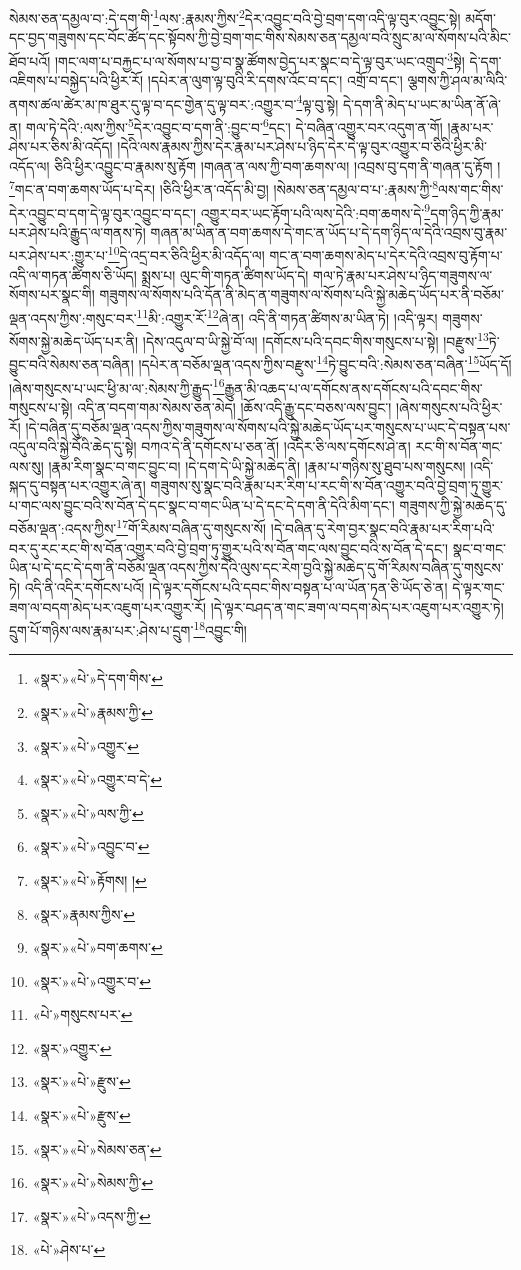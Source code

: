 སེམས་ཅན་དམྱལ་བ་:དེ་དག་གི་\footnote{«སྣར་»«པེ་»དེ་དག་གིས་}ལས་:རྣམས་ཀྱིས་\footnote{«སྣར་»«པེ་»རྣམས་ཀྱི་}དེར་འབྱུང་བའི་བྱེ་བྲག་དག་འདི་ལྟ་བུར་འབྱུང་སྟེ། མདོག་དང་བྱད་གཟུགས་དང་བོང་ཚོད་དང་སྟོབས་ཀྱི་བྱེ་བྲག་གང་གིས་སེམས་ཅན་དམྱལ་བའི་སྲུང་མ་ལ་སོགས་པའི་མིང་ཐོབ་པའོ། །གང་ལག་པ་བརྐྱང་པ་ལ་སོགས་པ་བྱ་བ་སྣ་ཚོགས་བྱེད་པར་སྣང་བ་དེ་ལྟ་བུར་ཡང་འགྲུབ་\footnote{«སྣར་»«པེ་»འགྱུར་}སྟེ། དེ་དག་འཇིགས་པ་བསྐྱེད་པའི་ཕྱིར་རོ། །དཔེར་ན་ལུག་ལྟ་བུའི་རི་དགས་འོང་བ་དང་། འགྲོ་བ་དང་། ལྕགས་ཀྱི་ཤལ་མ་ལིའི་ནགས་ཚལ་ཚེར་མ་ཁ་ཐུར་དུ་ལྟ་བ་དང་གྱེན་དུ་ལྟ་བར་:འགྱུར་བ་\footnote{«སྣར་»«པེ་»འགྱུར་བ་དེ་}ལྟ་བུ་སྟེ། དེ་དག་ནི་མེད་པ་ཡང་མ་ཡིན་ནོ་ཞེ་ན། གལ་ཏེ་དེའི་:ལས་ཀྱིས་\footnote{«སྣར་»«པེ་»ལས་ཀྱི་}དེར་འབྱུང་བ་དག་ནི་:བྱུང་བ་\footnote{«སྣར་»«པེ་»འབྱུང་བ་}དང་། དེ་བཞིན་འགྱུར་བར་འདུག་ན་གོ། །རྣམ་པར་ཤེས་པར་ཅིས་མི་འདོད། །དེའི་ལས་རྣམས་ཀྱིས་དེར་རྣམ་པར་ཤེས་པ་ཉིད་དེར་དེ་ལྟ་བུར་འགྱུར་བ་ཅིའི་ཕྱིར་མི་འདོད་ལ། ཅིའི་ཕྱིར་འབྱུང་བ་རྣམས་སུ་རྟོག །གཞན་ན་ལས་ཀྱི་བག་ཆགས་ལ། །འབྲས་བུ་དག་ནི་གཞན་དུ་རྟོག །\footnote{«སྣར་»«པེ་»རྟོགས། །}གང་ན་བག་ཆགས་ཡོད་པ་དེར། །ཅིའི་ཕྱིར་ན་འདོད་མི་བྱ། །སེམས་ཅན་དམྱལ་བ་པ་:རྣམས་ཀྱི་\footnote{«སྣར་»རྣམས་ཀྱིས་}ལས་གང་གིས་དེར་འབྱུང་བ་དག་དེ་ལྟ་བུར་འབྱུང་བ་དང་། འགྱུར་བར་ཡང་རྟོག་པའི་ལས་དེའི་:བག་ཆགས་དེ་\footnote{«སྣར་»«པེ་»བག་ཆགས་}དག་ཉིད་ཀྱི་རྣམ་པར་ཤེས་པའི་རྒྱུད་ལ་གནས་ཏེ། གཞན་མ་ཡིན་ན་བག་ཆགས་དེ་གང་ན་ཡོད་པ་དེ་དག་ཉིད་ལ་དེའི་འབྲས་བུ་རྣམ་པར་ཤེས་པར་:གྱུར་པ་\footnote{«སྣར་»«པེ་»འགྱུར་བ་}དེ་འདྲ་བར་ཅིའི་ཕྱིར་མི་འདོད་ལ། གང་ན་བག་ཆགས་མེད་པ་དེར་དེའི་འབྲས་བུ་རྟོག་པ་འདི་ལ་གཏན་ཚིགས་ཅི་ཡོད། སྨྲས་པ། ལུང་གི་གཏན་ཚིགས་ཡོད་དེ། གལ་ཏེ་རྣམ་པར་ཤེས་པ་ཉིད་གཟུགས་ལ་སོགས་པར་སྣང་གི། གཟུགས་ལ་སོགས་པའི་དོན་ནི་མེད་ན་གཟུགས་ལ་སོགས་པའི་སྐྱེ་མཆེད་ཡོད་པར་ནི་བཅོམ་ལྡན་འདས་ཀྱིས་:གསུང་བར་\footnote{«པེ་»གསུངས་པར་}མི་:འགྱུར་རོ་\footnote{«སྣར་»འགྱུར་}ཞེ་ན། འདི་ནི་གཏན་ཚིགས་མ་ཡིན་ཏེ། །འདི་ལྟར། གཟུགས་སོགས་སྐྱེ་མཆེད་ཡོད་པར་ནི། །དེས་འདུལ་བ་ཡི་སྐྱེ་བོ་ལ། །དགོངས་པའི་དབང་གིས་གསུངས་པ་སྟེ། །བརྫུས་\footnote{«སྣར་»«པེ་»རྫུས་}ཏེ་བྱུང་བའི་སེམས་ཅན་བཞིན། །དཔེར་ན་བཅོམ་ལྡན་འདས་ཀྱིས་བརྫུས་\footnote{«སྣར་»«པེ་»རྫུས་}ཏེ་བྱུང་བའི་:སེམས་ཅན་བཞིན་\footnote{«སྣར་»«པེ་»སེམས་ཅན་}ཡོད་དོ། །ཞེས་གསུངས་པ་ཡང་ཕྱི་མ་ལ་:སེམས་ཀྱི་རྒྱུད་\footnote{«སྣར་»«པེ་»སེམས་ཀྱི་}རྒྱུན་མི་འཆད་པ་ལ་དགོངས་ནས་དགོངས་པའི་དབང་གིས་གསུངས་པ་སྟེ། འདི་ན་བདག་གམ་སེམས་ཅན་མེད། །ཆོས་འདི་རྒྱུ་དང་བཅས་ལས་བྱུང་། །ཞེས་གསུངས་པའི་ཕྱིར་རོ། །དེ་བཞིན་དུ་བཅོམ་ལྡན་འདས་ཀྱིས་གཟུགས་ལ་སོགས་པའི་སྐྱེ་མཆེད་ཡོད་པར་གསུངས་པ་ཡང་དེ་བསྟན་པས་འདུལ་བའི་སྐྱེ་བོའི་ཆེད་དུ་སྟེ། བཀའ་དེ་ནི་དགོངས་པ་ཅན་ནོ། །འདིར་ཅི་ལས་དགོངས་ཤེ་ན། རང་གི་ས་བོན་གང་ལས་སུ། །རྣམ་རིག་སྣང་བ་གང་བྱུང་བ། །དེ་དག་དེ་ཡི་སྐྱེ་མཆེད་ནི། །རྣམ་པ་གཉིས་སུ་ཐུབ་པས་གསུངས། །འདི་སྐད་དུ་བསྟན་པར་འགྱུར་ཞེ་ན། གཟུགས་སུ་སྣང་བའི་རྣམ་པར་རིག་པ་རང་གི་ས་བོན་འགྱུར་བའི་བྱེ་བྲག་ཏུ་གྱུར་པ་གང་ལས་བྱུང་བའི་ས་བོན་དེ་དང་སྣང་བ་གང་ཡིན་པ་དེ་དང་དེ་དག་ནི་དེའི་མིག་དང་། གཟུགས་ཀྱི་སྐྱེ་མཆེད་དུ་བཅོམ་ལྡན་:འདས་ཀྱིས་\footnote{«སྣར་»«པེ་»འདས་ཀྱི་}གོ་རིམས་བཞིན་དུ་གསུངས་སོ། །དེ་བཞིན་དུ་རེག་བྱར་སྣང་བའི་རྣམ་པར་རིག་པའི་བར་དུ་རང་རང་གི་ས་བོན་འགྱུར་བའི་བྱེ་བྲག་ཏུ་གྱུར་པའི་ས་བོན་གང་ལས་བྱུང་བའི་ས་བོན་དེ་དང་། སྣང་བ་གང་ཡིན་པ་དེ་དང་དེ་དག་ནི་བཅོམ་ལྡན་འདས་ཀྱིས་དེའི་ལུས་དང་རེག་བྱའི་སྐྱེ་མཆེད་དུ་གོ་རིམས་བཞིན་དུ་གསུངས་ཏེ། འདི་ནི་འདིར་དགོངས་པའོ། །དེ་ལྟར་དགོངས་པའི་དབང་གིས་བསྟན་པ་ལ་ཡོན་ཏན་ཅི་ཡོད་ཅེ་ན། དེ་ལྟར་གང་ཟག་ལ་བདག་མེད་པར་འཇུག་པར་འགྱུར་རོ། །དེ་ལྟར་བཤད་ན་གང་ཟག་ལ་བདག་མེད་པར་འཇུག་པར་འགྱུར་ཏེ། དྲུག་པོ་གཉིས་ལས་རྣམ་པར་:ཤེས་པ་དྲུག་\footnote{«པེ་»ཤེས་པ་}འབྱུང་གི། 